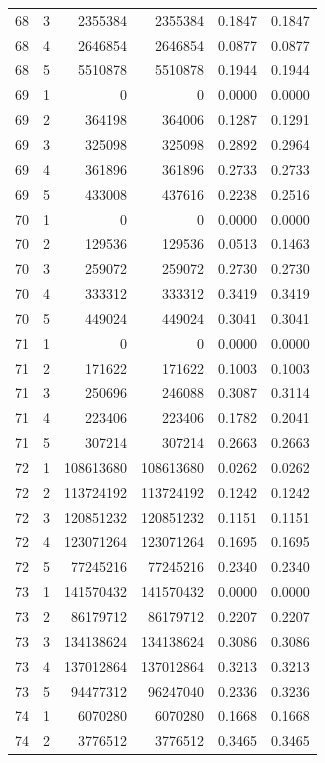 \begin{longtable}{rrrrrr}
68 & 3 & 2355384 & 2355384 & 0.1847 & 0.1847 \\
68 & 4 & 2646854 & 2646854 & 0.0877 & 0.0877 \\
68 & 5 & 5510878 & 5510878 & 0.1944 & 0.1944 \\
69 & 1 & 0 & 0 & 0.0000 & 0.0000 \\
69 & 2 & 364198 & 364006 & 0.1287 & 0.1291 \\
69 & 3 & 325098 & 325098 & 0.2892 & 0.2964 \\
69 & 4 & 361896 & 361896 & 0.2733 & 0.2733 \\
69 & 5 & 433008 & 437616 & 0.2238 & 0.2516 \\
70 & 1 & 0 & 0 & 0.0000 & 0.0000 \\
70 & 2 & 129536 & 129536 & 0.0513 & 0.1463 \\
70 & 3 & 259072 & 259072 & 0.2730 & 0.2730 \\
70 & 4 & 333312 & 333312 & 0.3419 & 0.3419 \\
70 & 5 & 449024 & 449024 & 0.3041 & 0.3041 \\
71 & 1 & 0 & 0 & 0.0000 & 0.0000 \\
71 & 2 & 171622 & 171622 & 0.1003 & 0.1003 \\
71 & 3 & 250696 & 246088 & 0.3087 & 0.3114 \\
71 & 4 & 223406 & 223406 & 0.1782 & 0.2041 \\
71 & 5 & 307214 & 307214 & 0.2663 & 0.2663 \\
72 & 1 & 108613680 & 108613680 & 0.0262 & 0.0262 \\
72 & 2 & 113724192 & 113724192 & 0.1242 & 0.1242 \\
72 & 3 & 120851232 & 120851232 & 0.1151 & 0.1151 \\
72 & 4 & 123071264 & 123071264 & 0.1695 & 0.1695 \\
72 & 5 & 77245216 & 77245216 & 0.2340 & 0.2340 \\
73 & 1 & 141570432 & 141570432 & 0.0000 & 0.0000 \\
73 & 2 & 86179712 & 86179712 & 0.2207 & 0.2207 \\
73 & 3 & 134138624 & 134138624 & 0.3086 & 0.3086 \\
73 & 4 & 137012864 & 137012864 & 0.3213 & 0.3213 \\
73 & 5 & 94477312 & 96247040 & 0.2336 & 0.3236 \\
74 & 1 & 6070280 & 6070280 & 0.1668 & 0.1668 \\
74 & 2 & 3776512 & 3776512 & 0.3465 & 0.3465 \\

\end{longtable}
